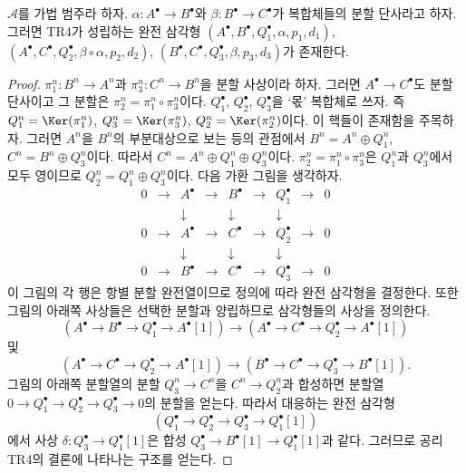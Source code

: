 \begin{lemma}
\label{lemma-two-split-injections}
$\mathcal{A}$를 가법 범주라 하자. $\alpha : A^\bullet \to B^\bullet$와
$\beta : B^\bullet \to C^\bullet$가 복합체들의 분할 단사라고 하자.
그러면 TR4가 성립하는 완전 삼각형
$(A^\bullet, B^\bullet, Q_1^\bullet, \alpha, p_1, d_1)$,
$(A^\bullet, C^\bullet, Q_2^\bullet, \beta \circ \alpha, p_2, d_2)$,
$(B^\bullet, C^\bullet, Q_3^\bullet, \beta, p_3, d_3)$가 존재한다.
\end{lemma}

\begin{proof}
$\pi_1^n : B^n \to A^n$과 $\pi_3^n : C^n \to B^n$을 분할 사상이라
하자. 그러면 $A^\bullet \to C^\bullet$도 분할 단사이고 그 분할은
$\pi_2^n = \pi_1^n \circ \pi_3^n$이다. $Q_1^\bullet$,
$Q_2^\bullet$, $Q_3^\bullet$을 ‘몫’ 복합체로 쓰자. 즉
$Q_1^n = \Ker(\pi_1^n)$, $Q_3^n = \Ker(\pi_3^n)$,
$Q_2^n = \Ker(\pi_2^n)$이다. 이 핵들이 존재함을 주목하자.
그러면 $A^n$을 $B^n$의 부분대상으로 보는 등의 관점에서
$B^n = A^n \oplus Q_1^n$, $C^n = B^n \oplus Q_3^n$이다.
따라서 $C^n = A^n \oplus Q_1^n \oplus Q_3^n$이다.
$\pi_2^n = \pi_1^n \circ \pi_3^n$은 $Q_1^n$과 $Q_3^n$에서 모두
영이므로 $Q_2^n = Q_1^n \oplus Q_3^n$이다. 다음 가환 그림을
생각하자.
$$
\begin{matrix}
0 & \to & A^\bullet & \to & B^\bullet & \to & Q_1^\bullet & \to & 0 \\
  &     & \downarrow &     & \downarrow &     & \downarrow  & \\
0 & \to & A^\bullet & \to & C^\bullet & \to & Q_2^\bullet & \to & 0 \\
  &     & \downarrow &     & \downarrow &     & \downarrow  & \\
0 & \to & B^\bullet & \to & C^\bullet & \to & Q_3^\bullet & \to & 0
\end{matrix}
$$
이 그림의 각 행은 항별 분할 완전열이므로 정의에 따라 완전
삼각형을 결정한다. 또한 그림의 아래쪽 사상들은 선택한 분할과
양립하므로 삼각형들의 사상을 정의한다.
$$
(A^\bullet \to B^\bullet \to Q_1^\bullet \to A^\bullet[1])
\longrightarrow
(A^\bullet \to C^\bullet \to Q_2^\bullet \to A^\bullet[1])
$$
및
$$
(A^\bullet \to C^\bullet \to Q_2^\bullet \to A^\bullet[1])
\longrightarrow
(B^\bullet \to C^\bullet \to Q_3^\bullet \to B^\bullet[1]).
$$
그림의 아래쪽 분할열의 분할 $Q_3^n \to C^n$을
$C^n \to Q_2^n$과 합성하면 분할열
$0 \to Q_1^\bullet \to Q_2^\bullet \to Q_3^\bullet \to 0$의
분할을 얻는다. 따라서 대응하는 완전 삼각형
$$
(Q_1^\bullet \to Q_2^\bullet \to Q_3^\bullet \to Q_1^\bullet[1])
$$
에서 사상 $\delta : Q_3^\bullet \to Q_1^\bullet[1]$은
합성 $Q_3^\bullet \to B^\bullet[1] \to Q_1^\bullet[1]$과 같다.
그러므로 공리 TR4의 결론에 나타나는 구조를 얻는다.
\end{proof}

